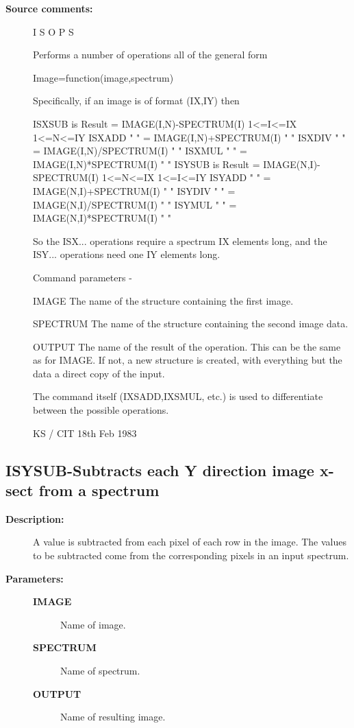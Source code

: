 \begin{description}
\begin{description}
\item [\textbf{Source comments:}]
\begin{terminalv}
 I S O P S

 Performs a number of operations all of the general form

 Image=function(image,spectrum)

 Specifically, if an image is of format (IX,IY) then

 ISXSUB is Result = IMAGE(I,N)-SPECTRUM(I) 1<=I<=IX 1<=N<=IY
 ISXADD  "   "    = IMAGE(I,N)+SPECTRUM(I)    "        "
 ISXDIV  "   "    = IMAGE(I,N)/SPECTRUM(I)    "        "
 ISXMUL  "   "    = IMAGE(I,N)*SPECTRUM(I)    "        "
 ISYSUB is Result = IMAGE(N,I)-SPECTRUM(I) 1<=N<=IX 1<=I<=IY
 ISYADD  "   "    = IMAGE(N,I)+SPECTRUM(I)    "        "
 ISYDIV  "   "    = IMAGE(N,I)/SPECTRUM(I)    "        "
 ISYMUL  "   "    = IMAGE(N,I)*SPECTRUM(I)    "        "

 So the ISX... operations require a spectrum IX elements long,
 and the ISY... operations need one IY elements long.

 Command parameters -

 IMAGE    The name of the structure containing the first image.

 SPECTRUM The name of the structure containing the second
          image data.

 OUTPUT   The name of the result of the operation.  This can
          be the same as for IMAGE.  If not, a new structure
          is created, with everything but the data a direct
          copy of the input.

 The command itself (IXSADD,IXSMUL, etc.) is used to
 differentiate between the possible operations.

                                  KS / CIT 18th Feb 1983
\end{terminalv}
\end{description}
\subsection{ISYSUB-\label{ISYSUB}Subtracts each Y direction image x-sect from a spectrum}
\begin{description}

\item [\textbf{Description:}]
 A value is subtracted from each pixel of each row in the image.
 The values to be subtracted come from the corresponding pixels
 in an input spectrum.

\item [\textbf{Parameters:}]
\begin{description}
\item [\textbf{IMAGE}]
 Name of image.
\item [\textbf{SPECTRUM}]
 Name of spectrum.
\item [\textbf{OUTPUT}]
 Name of resulting image.
\end{description}


\end{description}
\end{description}
